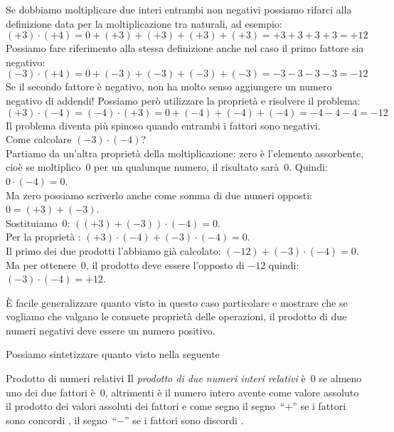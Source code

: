 Se dobbiamo moltiplicare due interi entrambi non negativi possiamo rifarci 
alla definizione data per la moltiplicazione tra naturali, ad esempio:
\[(+3) \cdot (+4) = 0 + (+3) + (+3) + (+3) + (+3) = +3+3+3+3 = +12\]
Possiamo fare riferimento alla stessa definizione anche nel caso il primo 
fattore sia negativo:
\[(-3) \cdot (+4) = 0 + (-3) + (-3) + (-3) + (-3) = -3-3-3-3 = -12\]
Se il secondo fattore è negativo, non ha molto senso aggiungere un numero 
negativo di addendi!
Possiamo però utilizzare la proprietà e 
risolvere il problema:
\[(+3) \cdot (-4) = (-4) \cdot (+3) = 
  0 + (-4) + (-4) + (-4) = -4-4-4 = -12\]
Il problema diventa più spinoso quando entrambi i fattori sono negativi.\\
Come calcolare \((-3) \cdot (-4)\)?\\
Partiamo da un'altra proprietà della moltiplicazione: zero è l'elemento 
assorbente, cioè se moltiplico~0 per un 
qualunque numero, il risultato 
sarà~0.
Quindi: \quad \(0 \cdot (-4) = 0\).\\
Ma zero possiamo scriverlo anche come somma di due 
 numeri opposti: \\ 
\(0 = (+3) + (-3)\).\\
Sostituiamo~0: \quad \(((+3) + (-3)) \cdot (-4) = 0\).\\
Per la proprietà : \quad 
\((+3) \cdot (-4) + (-3) \cdot (-4) = 0\).\\
Il primo dei due prodotti l'abbiamo già calcolato: \quad 
\((-12) + (-3) \cdot (-4) = 0\).\\
Ma per ottenere~0, il prodotto deve essere l'opposto di \(-12\) quindi: 
\quad \((-3) \cdot (-4) = +12\).

È facile generalizzare quanto visto in questo caso particolare e mostrare che 
se vogliamo che valgano le consuete proprietà delle operazioni, il prodotto 
di due numeri negativi deve essere un numero positivo.

Possiamo sintetizzare quanto visto nella seguente

\begin{definizione}{Prodotto di numeri relativi}{}
Il \emph{prodotto di due numeri interi relativi} è~0 se almeno uno dei due 
fattori è~0, altrimenti è il numero intero avente 
come valore assoluto il prodotto dei valori assoluti dei fattori e 
come segno 
il segno~``\(+\)'' se i fattori sono concordi
,
il segno~``\(-\)'' se i fattori sono discordi
.
\end{definizione}


